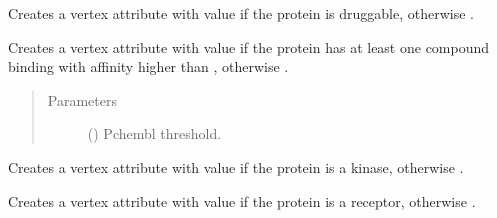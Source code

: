 \documentclass[letterpaper,10pt,english]{sphinxmanual}
\begin{document}
\begin{fulllineitems}
\begin{fulllineitems}
\end{fulllineitems}


\begin{fulllineitems}
\label{\detokenize{main:pypath.main.PyPath.set_druggability}}
Creates a vertex attribute  with value  if
the protein is druggable, otherwise .

\end{fulllineitems}


\begin{fulllineitems}
\label{\detokenize{main:pypath.main.PyPath.set_drugtargets}}
Creates a vertex attribute  with value  if
the protein has at least one compound binding with
affinity higher than , otherwise .
\begin{quote}\begin{description}
\item[{Parameters}] \leavevmode
{} () \textendash{} Pchembl threshold.

\end{description}\end{quote}

\end{fulllineitems}


\begin{fulllineitems}
\label{\detokenize{main:pypath.main.PyPath.set_kinases}}
Creates a vertex attribute  with value  if
the protein is a kinase, otherwise .

\end{fulllineitems}


\begin{fulllineitems}
\label{\detokenize{main:pypath.main.PyPath.set_receptors}}
Creates a vertex attribute  with value  if
the protein is a receptor, otherwise .


\end{fulllineitems}
\end{fulllineitems}
\end{document}
